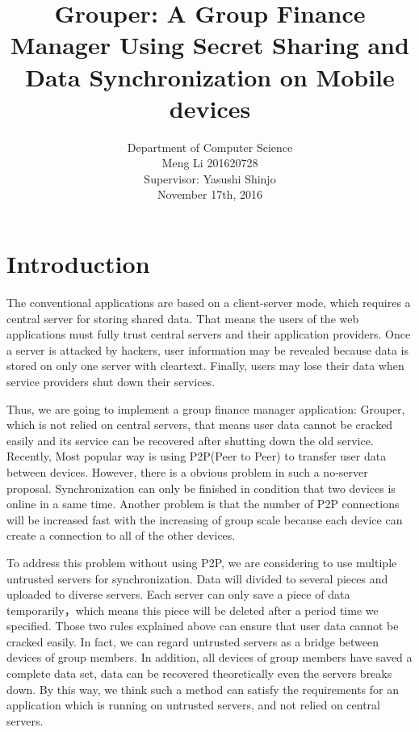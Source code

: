 \documentclass[twocolumn,10pt]{article}
\begin{document}
\date{}

\title{\bf Grouper: A Group Finance Manager Using Secret Sharing and Data Synchronization on Mobile devices}

\author{Department of Computer Science
	\\ Meng Li 201620728  
	\\ Supervisor: Yasushi Shinjo
	\\ November 17th, 2016
}

\maketitle

\section{Introduction}
The conventional applications are based on a client-server mode, which requires a central server for storing shared data. That means the users of the web applications must fully trust central servers and their application providers. Once a server is attacked by hackers, user information may be revealed because data is stored on only one server with cleartext. Finally, users may lose their data when service providers shut down their services.

Thus, we are going to implement a group finance manager application: Grouper, which is not relied on central servers, that means user data cannot be cracked easily and its service can be recovered after shutting down the old service. Recently, Most popular way is using P2P(Peer to Peer) to transfer user data between devices. However, there is a obvious problem in such a no-server proposal. Synchronization can only be finished in condition that two devices is online in a same time. Another problem is that the number of P2P connections will be increased fast with the increasing of group scale because each device can create a connection to all of the other devices. 

To address this problem without using P2P, we are considering to use multiple untrusted servers for synchronization. Data will divided to several pieces and uploaded to diverse servers. Each server can only save a piece of data temporarily，which means this piece will be deleted after a period time we specified. Those two rules explained above can ensure that user data cannot be cracked easily. In fact, we can regard untrusted servers as a bridge between devices of group members. In addition, all devices of group members have saved a complete data set, data can be recovered theoretically even the servers breaks down. By this way, we think such a method can satisfy the requirements for an application which is running on untrusted servers, and not relied on central servers.
\end{document}
